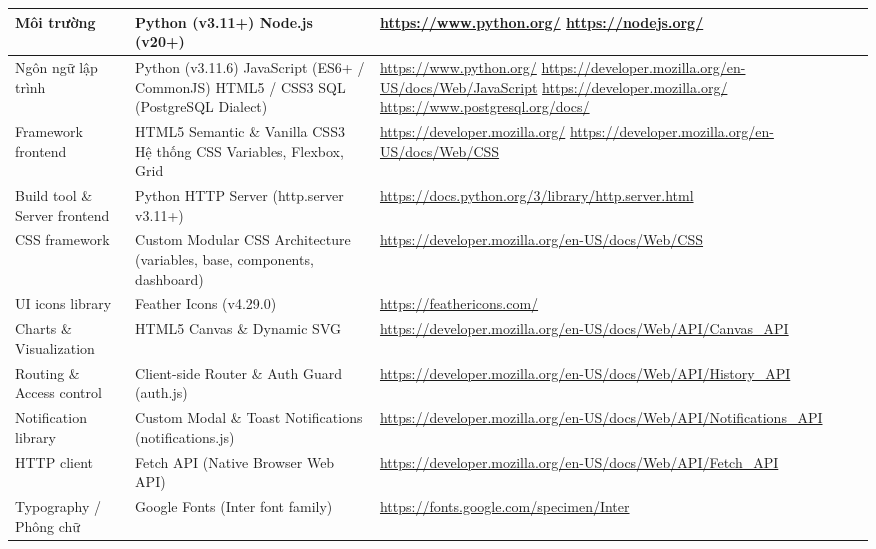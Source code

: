 \documentclass[12pt,a4paper]{report}
\begin{document}
\begin{longtable}{|>{\raggedright\arraybackslash}p{3.8cm}|>{\raggedright\arraybackslash}p{5.4cm}|>{\raggedright\arraybackslash}p{6.4cm}|}
    Môi trường & Python (v3.11+) \newline Node.js (v20+) & \url{https://www.python.org/} \newline \url{https://nodejs.org/} \\ \hline
    Ngôn ngữ lập trình & Python (v3.11.6) \newline JavaScript (ES6+ / CommonJS) \newline HTML5 / CSS3 \newline SQL (PostgreSQL Dialect) & \url{https://www.python.org/} \newline \url{https://developer.mozilla.org/en-US/docs/Web/JavaScript} \newline \url{https://developer.mozilla.org/} \newline \url{https://www.postgresql.org/docs/} \\ \hline
    Framework frontend & HTML5 Semantic \& Vanilla CSS3 \newline Hệ thống CSS Variables, Flexbox, Grid & \url{https://developer.mozilla.org/} \newline \url{https://developer.mozilla.org/en-US/docs/Web/CSS} \\ \hline
    Build tool \& Server frontend & Python HTTP Server (http.server v3.11+) & \url{https://docs.python.org/3/library/http.server.html} \\ \hline
    CSS framework & Custom Modular CSS Architecture (variables, base, components, dashboard) & \url{https://developer.mozilla.org/en-US/docs/Web/CSS} \\ \hline
    UI icons library & Feather Icons (v4.29.0) & \url{https://feathericons.com/} \\ \hline
    Charts \& Visualization & HTML5 Canvas \& Dynamic SVG & \url{https://developer.mozilla.org/en-US/docs/Web/API/Canvas_API} \\ \hline
    Routing \& Access control & Client-side Router \& Auth Guard (auth.js) & \url{https://developer.mozilla.org/en-US/docs/Web/API/History_API} \\ \hline
    Notification library & Custom Modal \& Toast Notifications (notifications.js) & \url{https://developer.mozilla.org/en-US/docs/Web/API/Notifications_API} \\ \hline
    HTTP client & Fetch API (Native Browser Web API) & \url{https://developer.mozilla.org/en-US/docs/Web/API/Fetch_API} \\ \hline
    Typography / Phông chữ & Google Fonts (Inter font family) & \url{https://fonts.google.com/specimen/Inter} \\ \hline

\end{longtable}
\end{document}
